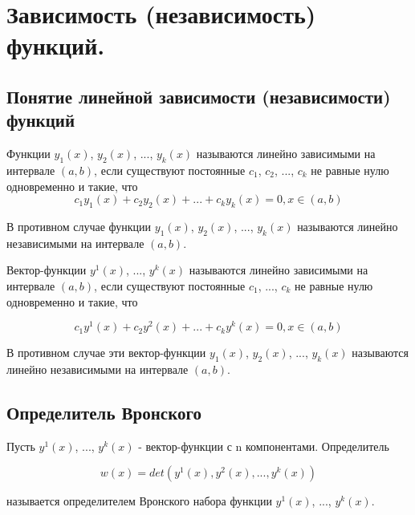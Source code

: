 \section{Зависимость (независимость) функций.}

\subsection{Понятие линейной зависимости (независимости) функций}

\begin{definition}
Функции $y_1(x)$, $y_2(x)$, ..., $y_k(x)$ называются линейно зависимыми на интервале $(a, b)$, если существуют постоянные $c_1$, $c_2$, ..., $c_k$ не равные нулю одновременно и такие, что 
\begin{equation}
    c_1y_1(x) + c_2y_2(x) + ... + c_ky_k(x) = 0, x \in (a, b)
\end{equation}
    
В противном случае функции $y_1(x)$, $y_2(x)$, ..., $y_k(x)$ называются линейно независимыми на интервале $(a, b)$.
\end{definition}

\begin{definition}
Вектор-функции $y^1(x)$, ..., $y^k(x)$ называются линейно зависимыми на интервале $(a, b)$, если существуют постоянные $c_1$, ..., $c_k$ не равные нулю одновременно и такие, что

\begin{equation}
    c_1y^1(x) + c_2y^2(x) + ... + c_ky^k(x) = 0, x \in (a, b)
\end{equation}

В противном случае эти вектор-функции $y_1(x)$, $y_2(x)$, ..., $y_k(x)$ называются линейно независимыми на интервале  $(a, b)$.
\end{definition}

\subsection{Определитель Вронского}

\begin{definition}
Пусть $y^1(x)$, ..., $y^k(x)$ - вектор-функции с n компонентами. Определитель 

\begin{equation}
    w(x) = det(y^1(x), y^2(x), ..., y^k(x))
\end{equation}

называется определителем Вронского набора функции {$y^1(x)$, ..., $y^k(x)$}.
\end{definition}

